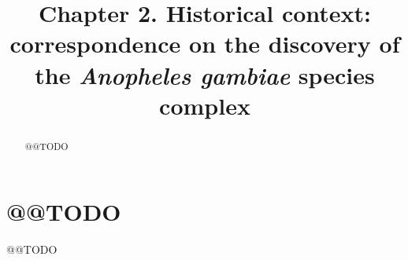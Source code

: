 \documentclass[a4paper,11pt,abstracton,hidelinks]{scrartcl}
\title{
Chapter 2. Historical context: correspondence on the discovery of the \textit{Anopheles gambiae} species complex
}
\author{}
\begin{document}
\renewcommand{\abstractname}{Summary}


\maketitle


\begin{abstract}


@@TODO
%


\end{abstract}


\tableofcontents


\section{@@TODO}


@@TODO


\printbibliography
\end{document}
